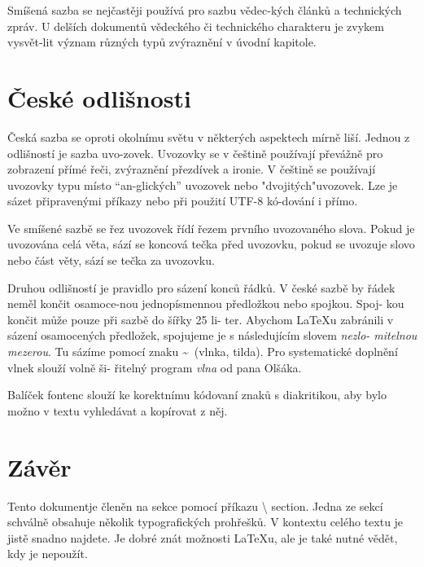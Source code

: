 \documentclass[10pt,twocolumn]{article}
\begin{document}
Smíšená sazba se nejčastěji používá pro sazbu vědec-\break kých
článků a technických zpráv. U delších dokumentů\break
vědeckého či technického charakteru je zvykem vysvět-\break lit
význam různých typů zvýraznění v úvodní kapitole.
\section{České odlišnosti}
\noindent Česká sazba se oproti okolnímu světu v některých\break
aspektech mírně liší. Jednou z odlišností je sazba uvo-\break zovek.
Uvozovky se v češtině používají převážně pro\break
zobrazení přímé řeči, zvýraznění přezdívek a ironie.\break
V češtině se používají uvozovky typu  místo “an-\break glických”
uvozovek nebo "dvojitých"uvozovek. Lze je\break
sázet připravenými příkazy nebo při použití UTF-8 kó-\break dování
i přímo.\par
Ve smíšené sazbě se řez uvozovek řídí řezem prvního\break
uvozovaného slova. Pokud je uvozována celá věta, sází\break
se koncová tečka před uvozovku, pokud se uvozuje slovo
nebo část věty, sází se tečka za uvozovku.\par
Druhou odlišností je pravidlo pro sázení konců\break
řádků. V české sazbě by řádek neměl končit osamoce-\break nou jednopísmennou
předložkou nebo spojkou. Spoj-\break
kou  končit může pouze při sazbě do šířky 25 li-\break
ter. Abychom \LaTeX u zabránili v sázení osamocených\break
předložek, spojujeme je s následujícím slovem \emph{nezlo-\break
mitelnou mezerou}. Tu sázíme pomocí znaku \textbf{\textasciitilde}\ (vlnka,\break
tilda). Pro systematické doplnění vlnek slouží volně ši-\break
řitelný program \textit{vlna} od pana Olšáka\footnotemark[1].\par
Balíček {\selectfont fontenc} slouží ke korektnímu kódovaní\break
znaků s diakritikou, aby bylo možno v textu vyhledávat\break
a kopírovat z něj.
\section{Závěr}
\noindent Tento dokument\footnotemark[2] je členěn na sekce pomocí příkazu\break
\textbackslash {\selectfont
section}. Jedna ze sekcí schválně obsahuje několik\break
typografických prohřešků. V kontextu celého textu je\break
jistě snadno najdete. Je dobré znát možnosti \LaTeX u,\break
ale je také nutné vědět, kdy je nepoužít.

\end{document}
